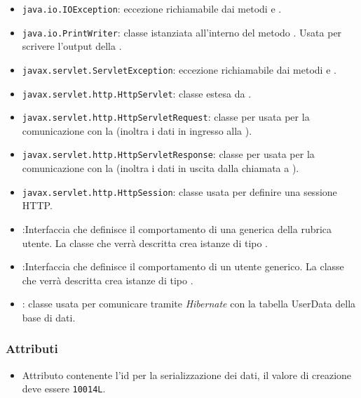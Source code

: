 \begin{itemize}
	\item \texttt{java.io.IOException}: eccezione richiamabile dai metodi  e .
	\item \texttt{java.io.PrintWriter}: classe istanziata all'interno del metodo . Usata per scrivere l'output della .
	\item \texttt{javax.servlet.ServletException}: eccezione richiamabile dai metodi  e .
	\item \texttt{javax.servlet.http.HttpServlet}: classe estesa da .
	\item \texttt{javax.servlet.http.HttpServletRequest}:  classe per usata per la comunicazione con la  (inoltra i dati in ingresso alla ).
	\item \texttt{javax.servlet.http.HttpServletResponse}: classe per usata per la comunicazione con la  (inoltra i dati in uscita dalla chiamata a ).
	\item \texttt{javax.servlet.http.HttpSession}: classe usata per definire una sessione HTTP.
	\item {}:Interfaccia che definisce il comportamento di una generica  della rubrica utente. La classe che verrà descritta crea istanze di tipo .
	\item {}:Interfaccia che definisce il comportamento di un utente generico. La classe che verrà descritta crea istanze di tipo .
	\item {}: classe usata per comunicare tramite \textit{Hibernate} con la tabella UserData della base di dati.
\end{itemize}

\subsubsection*{Attributi}

\begin{itemize}
	\item{}
	Attributo contenente l'id per la serializzazione dei dati, il valore di creazione deve essere \texttt{10014L}.
\end{itemize}

